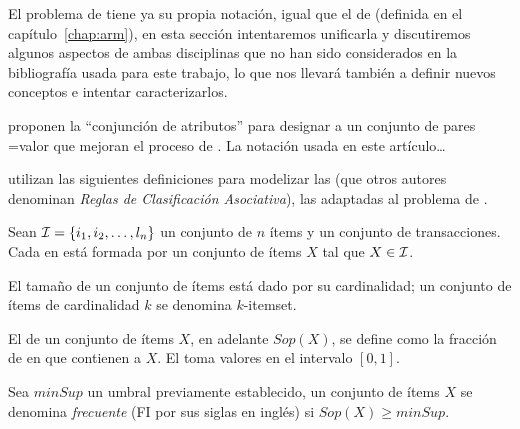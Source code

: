 El problema de \Clasificacion tiene ya su propia notación, igual que el de \arm (definida en el capítulo~\ref{chap:arm}), en esta sección intentaremos unificarla y discutiremos algunos aspectos de ambas disciplinas que no han sido considerados en la bibliografía usada para este trabajo, lo que nos llevará también a definir nuevos conceptos e intentar caracterizarlos.



\citet{DeshpandeKarypis-UsingConjunctionofAttributeValuesforClassification-2002} proponen la "`conjunción de atributos"' para designar a un conjunto de pares \atributo=valor que mejoran el proceso de \Clasificacion. La notación usada en este artículo\ldots



\citet{HLeonCarrascoHPalancarMTrinidad-DesarrolloDeClasificadoresBasadosEnRA-2010} utilizan las siguientes definiciones para modelizar las \CAR (que otros autores denominan \emph{Reglas de Clasificación Asociativa}), las \ars adaptadas al problema de \Clasificacion.

Sean $\I = \{i_1,i_2,\ldots,l_n\}$ un conjunto de $n$ ítems y \T un conjunto de transacciones. Cada \transaccion en \T está formada por un conjunto de ítems $X$ tal que $X\in\I$.
\begin{Definition}[\Itemset]
  El tamaño de un conjunto de ítems está dado por su cardinalidad; un conjunto de ítems de cardinalidad $k$ se denomina $k$-itemset.
\label{def:itemset}
\end{Definition}

\begin{Definition}[Soporte]
  El \soporte de un conjunto de ítems $X$, en adelante $Sop(X)$, se define como la fracción de \transacciones en \T que contienen a $X$. El \soporte toma valores en el intervalo $[0,1]$.
\label{def:soporte}
\end{Definition}

\begin{Definition}[$minSup$]
  Sea $minSup$ un umbral previamente establecido, un conjunto de ítems $X$ se denomina \emph{frecuente} (FI por sus siglas en inglés) si $Sop(X) \geq minSup$.
\label{def:flujo-de-datos}
\end{Definition}

